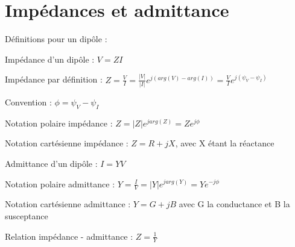 \documentclass[11pt]{report}
\begin{document}
\section{Impédances et admittance}
Définitions pour un dipôle :
\begin{framed}
  Impédance d'un dipôle : $V = ZI$\newline

  Impédance par définition : $Z = \frac{V}{I} = \frac{|V|}{|I|}e^{j(arg(V)-arg(I))} = \frac{V}{I}e^{j(\psi_V-\psi_I)}$\newline

  Convention : $\phi = \psi_V-\psi_I$\newline

  Notation polaire impédance : $Z = |Z|e^{jarg(Z)} = Ze^{j\phi}$\newline

  Notation cartésienne  impédance : $Z = R +jX$, avec X étant la réactance\newline

  Admittance d'un dipôle : $I= YV$\newline

  Notation polaire admittance : $Y = \frac{I}{V} = |Y|e^{jarg(Y)} = Ye^{-j\phi}$\newline

  Notation cartésienne admittance : $Y = G + jB$ avec G la conductance et B la susceptance\newline

  Relation impédance - admittance : $Z = \frac{1}{Y}$\newline

\end{framed}
\end{document}
